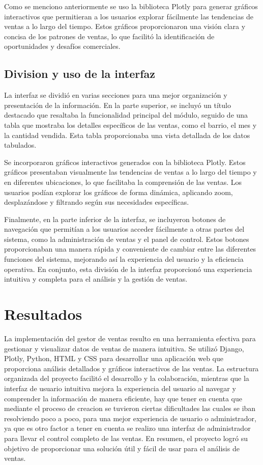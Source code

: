 \documentclass[conference]{IEEEtran}
\begin{document}
Como se menciono anteriormente se uso la biblioteca Plotly para generar gráficos interactivos que permitieran a los usuarios explorar fácilmente las tendencias de ventas a lo largo del tiempo. Estos gráficos proporcionaron una visión clara y concisa de los patrones de ventas, lo que facilitó la identificación de oportunidades y desafíos comerciales.


\subsection{Division y uso de la interfaz }

La interfaz se dividió en varias secciones para una mejor organización y presentación de la información. En la parte superior, se incluyó un título destacado que resaltaba la funcionalidad principal del módulo, seguido de una tabla que mostraba los detalles específicos de las ventas, como el barrio, el mes y la cantidad vendida. Esta tabla proporcionaba una vista detallada de los datos tabulados.

Se incorporaron gráficos interactivos generados con la biblioteca Plotly. Estos gráficos presentaban visualmente las tendencias de ventas a lo largo del tiempo y en diferentes ubicaciones, lo que facilitaba la comprensión de las ventas. Los usuarios podían explorar los gráficos de forma dinámica, aplicando zoom, desplazándose y filtrando según sus necesidades específicas.

Finalmente, en la parte inferior de la interfaz, se incluyeron botones de navegación que permitían a los usuarios acceder fácilmente a otras partes del sistema, como la administración de ventas y el panel de control. Estos botones proporcionaban una manera rápida y conveniente de cambiar entre las diferentes funciones del sistema, mejorando así la experiencia del usuario y la eficiencia operativa. En conjunto, esta división de la interfaz proporcionó una experiencia intuitiva y completa para el análisis y la gestión de ventas.

\section{Resultados}

La implementación del gestor de ventas resulto en una herramienta efectiva para gestionar y visualizar datos de ventas de manera intuitiva. Se utilizó Django, Plotly, Python, HTML y CSS para desarrollar una aplicación web que proporciona análisis detallados y gráficos interactivos de las ventas. La estructura organizada del proyecto facilitó el desarrollo y la colaboración, mientras que la interfaz de usuario intuitiva mejora la experiencia del usuario al navegar y comprender la información de manera eficiente, hay que tener en cuenta que mediante el proceso de creacion se tuvieron ciertas dificultades las cuales se iban resolviendo poco a poco, para una mejor experiencia de usuario o administrador, ya que es otro factor a tener en cuenta se realizo una interfaz de administrador para llevar el control completo de las ventas. En resumen, el proyecto logró su objetivo de proporcionar una solución útil y fácil de usar para el análisis de ventas.
\end{document}
